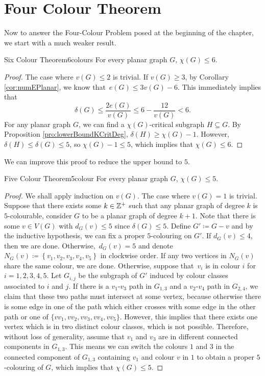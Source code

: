 \documentclass[math]{amznotes}
\theoremstyle{remark}
\begin{document}
\section{Four Colour Theorem}
Now to answer the Four-Colour Problem posed at the beginning of the chapter, we start with a much weaker result.
\begin{thmbox}{Six Colour Theorem}{6colours}
    For every planar graph $G$, $\chi(G) \leq 6$.
    \tcblower
    \begin{proof}
        The case where $v(G) \leq 2$ is trivial. If $v(G) \geq 3$, by Corollary \ref{cor:numEPlanar}, we know that~$e(G) \leq 3v(G) - 6$. This immediately implies that 
        \begin{equation*}
            \delta(G) \leq \frac{2e(G)}{v(G)} \leq 6 - \frac{12}{v(G)} < 6.
        \end{equation*}
        For any planar graph $G$, we can find a $\chi(G)$-critical subgraph $H \subseteq G$. By Proposition \ref{pro:lowerBoundKCritDeg}, $\delta(H) \geq \chi(G) - 1$. However, $\delta(H) \leq \delta(G) \leq 5$, so $\chi(G) - 1 \leq 5$, which implies that $\chi(G) \leq 6$.
    \end{proof}
\end{thmbox}
We can improve this proof to reduce the upper bound to $5$.
\begin{thmbox}{Five Colour Theorem}{5colour}
    For every planar graph $G$, $\chi(G) \leq 5$.
    \tcblower
    \begin{proof}
        We shall apply induction on $v(G)$. The case where $v(G) = 1$ is trivial. Suppose that there exists some $k \in \mathbb{Z}^+$ such that any planar graph of degree $k$ is $5$-colourable, consider $G$ to be a planar graph of degree $k + 1$. Note that there is some $v \in V(G)$ with $d_G(v) \leq 5$ since $\delta(G) \leq 5$. Define $G' \coloneqq G - v$ and by the inductive hypothesis, we can fix a proper $5$-colouring on $G'$. If $d_G(v) \leq 4$, then we are done. Otherwise,~$d_G(v) = 5$ and denote $N_G(v) \coloneqq \left\{v_1, v_2, v_3, v_4, v_5\right\}$ in clockwise order. If any two vertices in $N_G(v)$ share the same colour, we are done. Otherwise, suppose that~$v_i$ is in colour $i$ for $i = 1, 2, 3, 4, 5$. Let $G_{i, j}$ be the subgraph of $G'$ induced by colour classes associated to $i$ and $j$. If there is a $v_1$-$v_3$ path in $G_{1, 3}$ and a $v_2$-$v_4$ path in $G_{2, 4}$, we claim that these two paths must intersect at some vertex, because otherwise there is some edge in one of the path which either crosses with some edge in the other path or one of $\{vv_1, vv_2, vv_3, vv_4, vv_5\}$. However, this implies that there exists one vertex which is in two distinct colour classes, which is not possible. Therefore, without loss of generality, assume that $v_1$ and $v_3$ are in different connected components in $G_{1, 3}$. This means we can switch the colours $1$ and $3$ in the connected component of $G_{1, 3}$ containing $v_1$ and colour $v$ in $1$ to obtain a proper $5$-colouring of $G$, which implies that $\chi(G) \leq 5$.
    \end{proof}
\end{thmbox}
\end{document}
